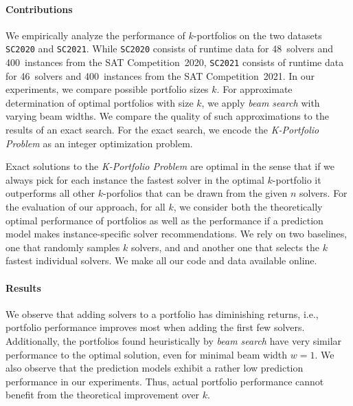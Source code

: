\documentclass[conference]{IEEEtran}
\begin{document}
\paragraph{Contributions}

We empirically analyze the performance of $k$-portfolios on the two datasets \texttt{SC2020} and \texttt{SC2021}. 
While \texttt{SC2020} consists of runtime data for 48~solvers and 400~instances from the SAT Competition~2020, \texttt{SC2021} consists of runtime data for 46~solvers and 400~instances from the SAT Competition~2021. 
In our experiments, we compare possible portfolio sizes $k$. 
For approximate determination of optimal portfolios with size $k$, we apply \emph{beam search} with varying beam widths. %
We compare the quality of such approximations to the results of an exact search.
For the exact search, we encode the \emph{K-Portfolio Problem} as an integer optimization problem. 

Exact solutions to the \emph{K-Portfolio Problem} are optimal in the sense that if we always pick for each instance the fastest solver in the optimal $k$-portfolio it outperforms all other $k$-porfolios that can be drawn from the given $n$ solvers. 
For the evaluation of our approach, for all $k$, we consider both the theoretically optimal performance of portfolios %
as well as the performance if a prediction model makes instance-specific solver recommendations. %
We rely on two baselines, one that randomly samples $k$ solvers, and and another one that selects the $k$ fastest individual solvers. %
We make all our code and data available online.

\paragraph{Results}

We observe that adding solvers to a portfolio has diminishing returns, i.e., portfolio performance improves most when adding the first few solvers. %
Additionally, the portfolios found heuristically by \emph{beam search} have very similar performance to the optimal solution, even for minimal beam width $w=1$. %
We also observe that the prediction models exhibit a rather low prediction performance in our experiments. %
Thus, actual portfolio performance cannot benefit from the theoretical improvement over $k$. 
\end{document}
